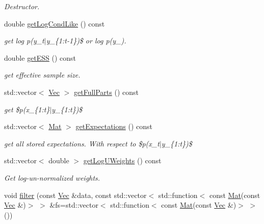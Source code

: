 \begin{DoxyCompactItemize}
\begin{DoxyCompactList}\small\item\em Destructor. \end{DoxyCompactList}\item 
double \hyperlink{classSISRFilter_a9bec319e692266cacdd7e6cd9b60e77d}{get\+Log\+Cond\+Like} () const 
\begin{DoxyCompactList}\small\item\em get log p(y\+\_\+t$\vert$y\+\_\+\{1\+:t-\/1\})\$ or log p(y\+\_). \end{DoxyCompactList}\item 
double \hyperlink{classSISRFilter_aab226ed51d07c493151a6788e6f90b86}{get\+E\+SS} () const 
\begin{DoxyCompactList}\small\item\em get effective sample size. \end{DoxyCompactList}\item 
std\+::vector$<$ \hyperlink{apf__filter_8h_a4c7df05c6f5e8a0d15ae14bcdbc07152}{Vec} $>$ \hyperlink{classSISRFilter_aff930757bb06eda7b180342ba04fc335}{get\+Full\+Parts} () const 
\begin{DoxyCompactList}\small\item\em get \$p(x\+\_\+\{1\+:t\}$\vert$y\+\_\+\{1\+:t\})\$ \end{DoxyCompactList}\item 
std\+::vector$<$ \hyperlink{apf__filter_8h_ae601f56a556993079f730483c574356f}{Mat} $>$ \hyperlink{classSISRFilter_a4dd3b90b857114e599a8f71703cb768e}{get\+Expectations} () const 
\begin{DoxyCompactList}\small\item\em get all stored expectations. With respect to \$p(x\+\_\+t$\vert$y\+\_\+\{1\+:t\})\$ \end{DoxyCompactList}\item 
std\+::vector$<$ double $>$ \hyperlink{classSISRFilter_aa87ac349cbc21f70fb51c24fcbbc521a}{get\+Log\+U\+Weights} () const 
\begin{DoxyCompactList}\small\item\em Get log-\/un-\/normalized weights. \end{DoxyCompactList}\item 
void \hyperlink{classSISRFilter_a0c1a506e724152d49011083095f523d0}{filter} (const \hyperlink{apf__filter_8h_a4c7df05c6f5e8a0d15ae14bcdbc07152}{Vec} \&data, const std\+::vector$<$ std\+::function$<$ const \hyperlink{apf__filter_8h_ae601f56a556993079f730483c574356f}{Mat}(const \hyperlink{apf__filter_8h_a4c7df05c6f5e8a0d15ae14bcdbc07152}{Vec} \&)$>$ $>$ \&fs=std\+::vector$<$ std\+::function$<$ const \hyperlink{apf__filter_8h_ae601f56a556993079f730483c574356f}{Mat}(const \hyperlink{apf__filter_8h_a4c7df05c6f5e8a0d15ae14bcdbc07152}{Vec} \&)$>$ $>$())

\end{DoxyCompactItemize}
